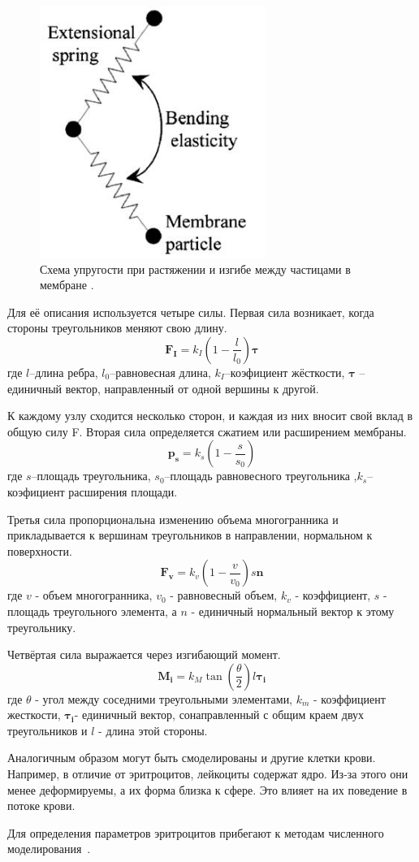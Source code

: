 \documentclass[a4paper, 14pt]{article}
\begin{document}
\begin{figure}[h]
\centering
\includegraphics[width=0.3\linewidth]{mol3.png}
\caption{ Схема упругости при растяжении и изгибе между частицами в мембране \cite{hosseini:2009}.}
\label{fig:mpr}
\end{figure}

Для её описания используется четыре силы.
Первая сила возникает, когда стороны треугольников меняют свою длину.
$$\mathbf {F_I}=k_I(1- \frac{l}{l_0}) \mathbf {\tau}$$
где $l$--длина ребра, $l_0$--равновесная длина, $k_I$--коэфициент жёсткости, $\mathbf { \tau}$ --единичный вектор, направленный от одной вершины к другой.

К каждому узлу сходится несколько сторон, и каждая из них вносит свой вклад в общую силу F. Вторая сила определяется сжатием или расширением мембраны.  
$$\mathbf {p_s}=k_s(1- \frac{s}{s_0})$$
где $s$--площадь треугольника, $s_0$--площадь равновесного треугольника ,$k_s$--коэфициент расширения площади.

Третья сила пропорциональна изменению объема многогранника и прикладывается к вершинам треугольников в направлении, нормальном к поверхности. 
$$\mathbf {F_v}=k_v(1- \frac{v}{v_0}) s \mathbf{n}$$
где $v$ - объем многогранника, $v_0$ - равновесный объем, $k_v$ - коэффициент, $s$ - площадь
треугольного элемента, а $n$ - единичный нормальный вектор к этому треугольнику.

Четвёртая сила выражается через изгибающий момент\cite{hosseini:2009}.
$$\mathbf {M_i}=k_M \tan(\frac{\theta}{2})l \mathbf{\tau_i}$$
где $\theta$ - угол между соседними треугольными элементами, $k_m$ - коэффициент жесткости, $\mathbf{\tau_i}$- единичный вектор, сонаправленный с общим краем двух треугольников и $l$ - длина этой стороны.

Аналогичным образом могут быть смоделированы и другие клетки крови. Например, в отличие от эритроцитов, лейкоциты содержат ядро. Из-за этого они менее деформируемы, а их форма близка к сфере. Это влияет на их поведение в потоке крови.

Для определения параметров эритроцитов прибегают к методам численного моделирования~\cite{bessonov:2014}.
\end{document}
